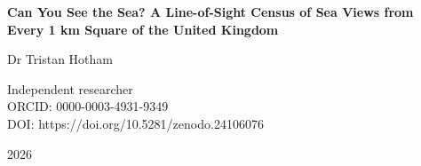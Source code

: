 \documentclass[11pt,a4paper]{article}
\begin{document}
\begin{center}
{\Large\bfseries Can You See the Sea? A Line-of-Sight Census of Sea Views from Every 1 km Square of the United Kingdom\par}
\vspace{1.2em}
{\large Dr Tristan Hotham\par}
\vspace{0.3em}
{\small Independent researcher\\
ORCID: 0000-0003-4931-9349\\
DOI: https://doi.org/10.5281/zenodo.24106076\par}
\vspace{0.8em}
2026
\end{center}

\end{document}
